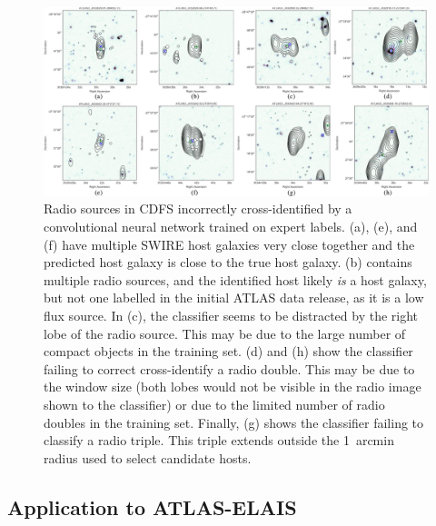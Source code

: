 \documentclass[fleqn,usenatbib,usedcolumn]{mnras}
\begin{document}
  \begin{figure}
  \includegraphics[width=\textwidth]{images/CNN-examples-CDFS.png}
      \caption{Radio sources in CDFS incorrectly cross-identified by a
        convolutional neural network trained on expert labels.
        (a), (e), and (f) have multiple SWIRE host galaxies very close
        together and the predicted host galaxy is close to the true host galaxy.
        (b) contains multiple radio sources, and the
        identified host likely \emph{is} a host galaxy, but not one labelled in
        the initial ATLAS data release, as it is a low flux source. In
        (c), the classifier seems to be distracted by the
        right lobe of the radio source. This may be due to the large number of
        compact objects in the training set.
        (d) and (h) show the
        classifier failing to correct cross-identify a radio double. This may be
        due to the window size (both lobes would not be visible in the radio image
        shown to the classifier) or due to the limited number of radio doubles in
        the training set. Finally,
       (g) shows the classifier failing to classify a radio
        triple. This triple extends outside the 1~arcmin radius used to select
        candidate hosts.}\label{fig:cnnexamples}
  \end{figure}

\subsection{Application to ATLAS-ELAIS}
  \label{sec:elais}
\end{document}
